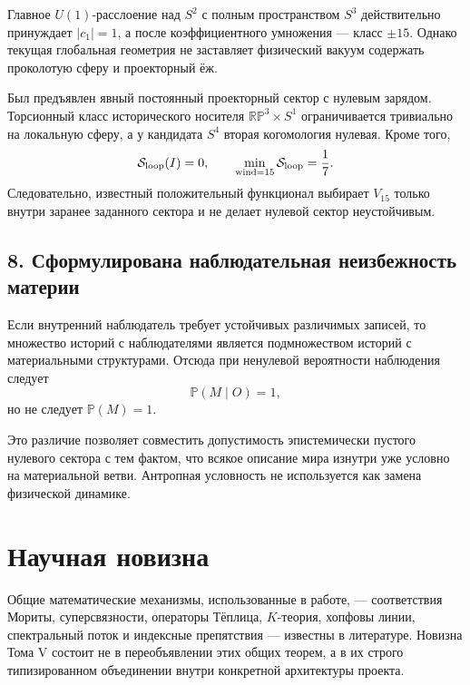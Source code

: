 Главное $U(1)$-расслоение над $S^2$ с полным пространством $S^3$
действительно принуждает $|c_1|=1$, а после коэффициентного умножения ---
класс $\pm15$. Однако текущая глобальная геометрия не заставляет физический
вакуум содержать проколотую сферу и проекторный ёж.

Был предъявлен явный постоянный проекторный сектор с нулевым зарядом.
Торсионный класс исторического носителя $\mathbb{RP}^3\times S^1$
ограничивается тривиально на локальную сферу, а у кандидата $S^4$ вторая
когомология нулевая. Кроме того,
\begin{equation}
 \mathcal S_{\rm loop}(I)=0,
 \qquad
 \min_{\operatorname{wind}=15}\mathcal S_{\rm loop}=\frac17.
\end{equation}
Следовательно, известный положительный функционал выбирает $V_{15}$ только
внутри заранее заданного сектора и не делает нулевой сектор неустойчивым.

\subsection*{8. Сформулирована наблюдательная неизбежность материи}

Если внутренний наблюдатель требует устойчивых различимых записей, то
множество историй с наблюдателями является подмножеством историй с
материальными структурами. Отсюда при ненулевой вероятности наблюдения
следует
\begin{equation}
 \mathbb P(M\mid O)=1,
\end{equation}
но не следует $\mathbb P(M)=1$.

Это различие позволяет совместить допустимость эпистемически пустого
нулевого сектора с тем фактом, что всякое описание мира изнутри уже
условно на материальной ветви. Антропная условность не используется как
замена физической динамике.

\section*{Научная новизна}

Общие математические механизмы, использованные в работе, --- соответствия
Мориты, суперсвязности, операторы Тёплица, $K$-теория, хопфовы линии,
спектральный поток и индексные препятствия --- известны в литературе.
Новизна Тома V состоит не в переобъявлении этих общих теорем, а в их
строго типизированном объединении внутри конкретной архитектуры проекта.

